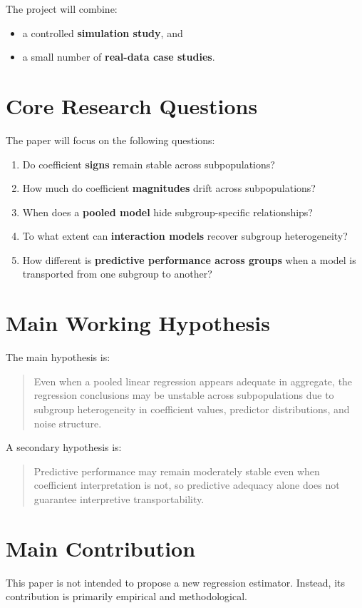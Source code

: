 \documentclass[11pt]{article}
\begin{document}
The project will combine:
\begin{itemize}
    \item a controlled \textbf{simulation study}, and
    \item a small number of \textbf{real-data case studies}.
\end{itemize}

\section{Core Research Questions}
The paper will focus on the following questions:
\begin{enumerate}[label=\textbf{RQ\arabic*.}]
    \item Do coefficient \textbf{signs} remain stable across subpopulations?
    \item How much do coefficient \textbf{magnitudes} drift across subpopulations?
    \item When does a \textbf{pooled model} hide subgroup-specific relationships?
    \item To what extent can \textbf{interaction models} recover subgroup heterogeneity?
    \item How different is \textbf{predictive performance across groups} when a model is transported from one subgroup to another?
\end{enumerate}

\section{Main Working Hypothesis}
The main hypothesis is:
\begin{quote}
Even when a pooled linear regression appears adequate in aggregate, the regression conclusions may be unstable across subpopulations due to subgroup heterogeneity in coefficient values, predictor distributions, and noise structure.
\end{quote}

A secondary hypothesis is:
\begin{quote}
Predictive performance may remain moderately stable even when coefficient interpretation is not, so predictive adequacy alone does not guarantee interpretive transportability.
\end{quote}

\section{Main Contribution}
This paper is not intended to propose a new regression estimator. Instead, its contribution is primarily empirical and methodological.
\end{document}
